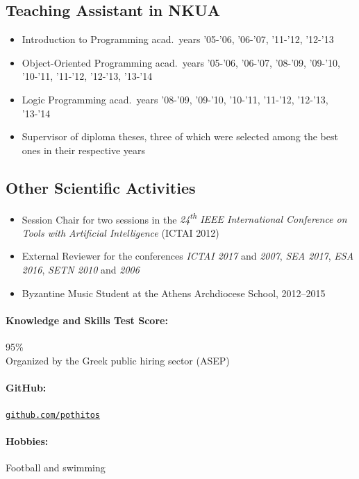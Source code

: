 \documentclass[a4paper]{article}
\begin{document}
\begin{cv}{}
\subsection*{Teaching Assistant in NKUA}
\begin{itemize}
    \item \textsf{Introduction to Programming} acad.\ years
          '05-'06, '06-'07, '11-'12, '12-'13
    \item \textsf{Object-Oriented Programming} acad.\ years
          '05-'06, '06-'07, '08-'09, '09-'10, '10-'11,
          '11-'12, '12-'13, '13-'14
    \item \textsf{Logic Programming} acad.\ years '08-'09,
          '09-'10, '10-'11, '11-'12, '12-'13, '13-'14
    \item \textsf{Supervisor} of diploma theses, three of
          which were selected among the best ones in their
          respective years
\end{itemize}

\subsection*{Other Scientific Activities}
\begin{itemize}
    \item \textsf{Session Chair} for two sessions in the
          \emph{24\textsuperscript{th} IEEE International
          Conference on Tools with Artificial Intelligence}
          (ICTAI 2012)
    \item \textsf{External Reviewer} for the conferences
          \emph{ICTAI 2017} and \emph{2007}, \emph{SEA
          2017}, \emph{ESA 2016}, \emph{SETN 2010} and
          \emph{2006}
    \item \textsf{Byzantine Music Student} at the Athens
           Archdiocese School, 2012--2015
\end{itemize}

\paragraph{Knowledge and Skills Test Score:} 95\% \\
Organized by the Greek public hiring sector (ASEP)

\paragraph{GitHub:}
\href{https://github.com/pothitos}{\texttt{github.com/pothitos}}

\paragraph{Hobbies:} Football and swimming

\date{}

\end{cv}
\end{document}
